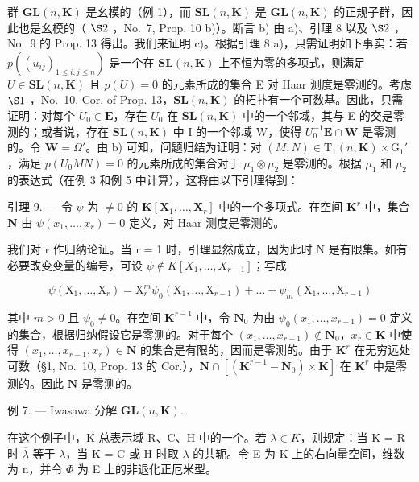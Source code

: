 群 \(\mathbf{GL}(n,\mathbf{K})\) 是幺模的（例 1），而 \(\mathbf{SL}(n,\mathbf{K})\) 是 \(\mathbf{GL}(n,\mathbf{K})\) 的正规子群，因此也是幺模的（ \(\S 2\) ，No.~7, Prop. 10 b)）。断言 b) 由 a)、引理 8 以及 \(\S 2\) ，No.~9 的 Prop. 13 得出。我们来证明 c)。根据引理 8 a)，只需证明如下事实：若 \(p((u_{ij})_{1 \leqslant i,j \leqslant n})\) 是一个在 \(\mathbf{SL}(n,\mathbf{K})\) 上不恒为零的多项式，则满足 \(U \in \mathbf{SL}(n,\mathbf{K})\) 且 \(p(U) = 0\) 的元素所成的集合 E 对 Haar 测度是零测的。考虑 \(\S 1\) ，No.~10, Cor. of Prop. 13，\(\mathbf{SL}(n,\mathbf{K})\) 的拓扑有一个可数基。因此，只需证明：对每个 \(U_0 \in \mathbf{E}\)，存在 \(U_0\) 在 \(\mathbf{SL}(n,\mathbf{K})\) 中的一个邻域，其与 E 的交是零测的；或者说，存在 \(\mathbf{SL}(n,\mathbf{K})\) 中 I 的一个邻域 W，使得 \(U_0^{-1}\mathbf{E} \cap \mathbf{W}\) 是零测的。令 \(\mathbf{W} = \Omega'\)。由 b) 可知，问题归结为证明：对 \((M,N) \in \mathrm{T}_1(n,\mathbf{K}) \times \mathrm{G}_1'\)，满足 \(p(U_0MN) = 0\) 的元素所成的集合对于 \(\mu_1 \otimes \mu_2\) 是零测的。根据 \(\mu_1\) 和 \(\mu_2\) 的表达式（在例 3 和例 5 中计算），这将由以下引理得到：

引理 9. --- 令 \(\psi\) 为 \(\neq 0\) 的 \(\mathbf{K}[\mathbf{X}_1, \ldots, \mathbf{X}_r]\) 中的一个多项式。在空间 \(\mathbf{K}^r\) 中，集合 \(\mathbf{N}\) 由 \(\psi(x_1, \ldots, x_r) = 0\) 定义，对 Haar 测度是零测的。

我们对 r 作归纳论证。当 r = 1 时，引理显然成立，因为此时 N 是有限集。如有必要改变变量的编号，可设 \(\psi \notin K[X_{1}, \ldots, X_{r-1}]\)；写成

\[
\psi \left(\mathrm{X} _ {1}, \dots , \mathrm{X} _ {r}\right) = \mathrm{X} _ {r} ^ {m} \psi_ {0} \left(\mathrm{X} _ {1}, \dots , \mathrm{X} _ {r - 1}\right) + \dots + \psi_ {m} \left(\mathrm{X} _ {1}, \dots , \mathrm{X} _ {r - 1}\right)
\]

其中 \(m > 0\) 且 \(\psi_0 \neq 0\)。在空间 \(\mathbf{K}^{r-1}\) 中，令 \(\mathbf{N}_0\) 为由 \(\psi_0(x_1, \ldots, x_{r-1}) = 0\) 定义的集合，根据归纳假设它是零测的。对于每个 \((x_1, \ldots, x_{r-1}) \notin \mathbf{N}_0\)，\(x_r \in \mathbf{K}\) 中使得 \((x_1, \ldots, x_{r-1}, x_r) \in \mathbf{N}\) 的集合是有限的，因而是零测的。由于 \(\mathbf{K}^r\) 在无穷远处可数（§1, No.~10, Prop. 13 的 Cor.），\(\mathbf{N} \cap [(\mathbf{K}^{r-1} - \mathbf{N}_0) \times \mathbf{K}]\) 在 \(\mathbf{K}^r\) 中是零测的。因此 \(\mathbf{N}\) 是零测的。

例 7. --- Iwasawa 分解 \(\mathbf{GL}(n,\mathbf{K})\).

在这个例子中，K 总表示域 R、C、H 中的一个。若 \(\lambda \in K\)，则规定：当 K = R 时 \(\overline{\lambda}\) 等于 \(\lambda\)，当 K = C 或 H 时取 \(\lambda\) 的共轭。令 E 为 K 上的右向量空间，维数为 n，并令 \(\Phi\) 为 E 上的非退化正厄米型。

